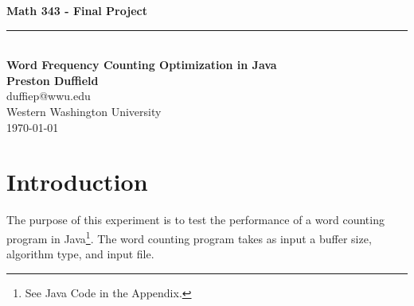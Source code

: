 \documentclass{article}
\begin{document}
\noindent

\begin{center}
    \vspace*{0.3\textheight}
    {\fontsize{80}{18}\textbf{Math 343 - Final Project}}\\
    \vspace{6pt} %
    \rule{0.87\linewidth}{1pt}\\ %
    \vspace{12pt} %
    \LARGE\textbf{Word Frequency Counting Optimization in Java}\\
    
    \vspace{12pt}
    \Large\textbf{Preston Duffield} \\
    \Large duffiep@wwu.edu \\
    \Large Western Washington University \\
    \today
    \vspace{24pt}
\end{center}

%
%
%
\clearpage
\tableofcontents
\clearpage
\section{Introduction}
  The purpose of this experiment is to test the performance of a
  word counting program in Java\footnote{See Java Code in the Appendix.}.
  The word counting program takes as input a buffer size, algorithm type, and input file.
\end{document}

